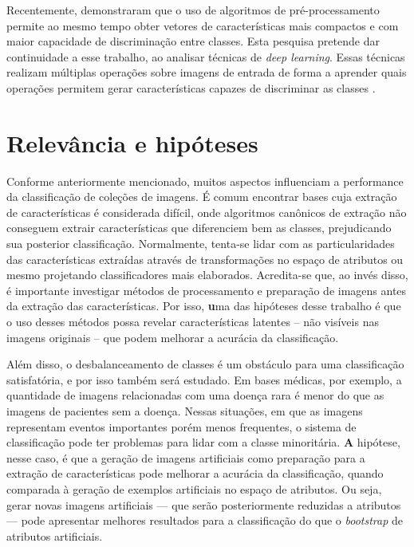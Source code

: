 Recentemente,  demonstraram que o uso de algoritmos de pré\hyp{}processamento permite ao mesmo tempo obter vetores de características mais compactos e com maior capacidade de discriminação entre classes. Esta pesquisa pretende dar continuidade a esse trabalho, ao analisar técnicas de \textit{deep learning}. Essas técnicas realizam múltiplas operações sobre imagens de entrada de forma a aprender quais operações permitem gerar características capazes de discriminar as classes \cite{bengio2009}.



\section{Relevância e hipóteses}

Conforme anteriormente mencionado, muitos aspectos influenciam a performance da classificação de coleções de imagens. É comum encontrar bases cuja extração de características é considerada difícil, onde algoritmos canônicos de extração não conseguem extrair características que diferenciem bem as classes, prejudicando sua posterior classificação. Normalmente, tenta-se lidar com as particularidades das características extraídas através de transformações no espaço de atributos ou mesmo projetando classificadores mais elaborados. Acredita-se que, ao invés disso, é importante investigar métodos de processamento e preparação de imagens antes da extração das características. Por isso, {\textbf uma das hipóteses desse trabalho é que o uso desses métodos possa revelar características latentes -- não visíveis nas imagens originais -- que podem melhorar a acurácia da classificação.}


Além disso,
o desbalanceamento de classes é um obstáculo para uma classificação satisfatória, e por isso também será estudado.
Em bases médicas, por exemplo, a quantidade de imagens relacionadas com uma doença rara é menor do que as imagens de pacientes sem a doença. Nessas situações, em que as imagens representam eventos importantes porém menos frequentes, o sistema de classificação pode ter problemas para lidar com a classe minoritária. {\textbf A hipótese, nesse caso, é que a geração de imagens artificiais como preparação para a extração de características pode melhorar a acurácia da classificação, quando comparada à geração de exemplos artificiais no espaço de atributos.} Ou seja, gerar novas imagens artificiais — que serão posteriormente reduzidas a atributos — pode apresentar melhores resultados para a classificação do que o \textit{bootstrap} de atributos artificiais.

